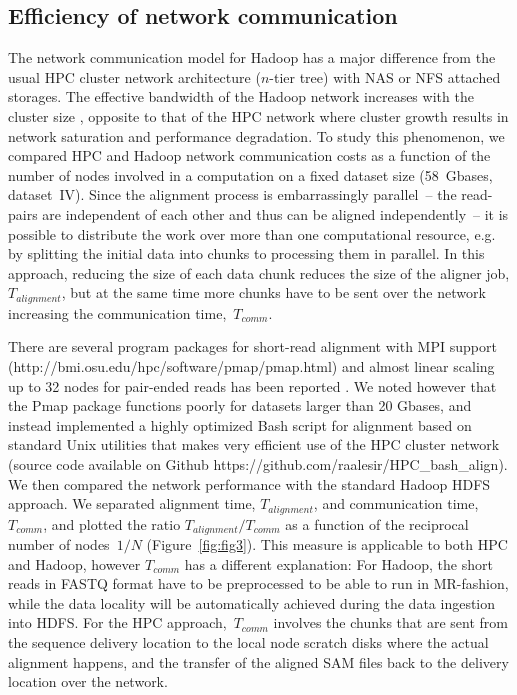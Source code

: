 \documentclass{bioinfo}
\begin{document}
\subsection*{Efficiency of network communication}

The network communication model for Hadoop has a major difference from the usual HPC cluster network architecture ($n$-tier tree) with NAS or NFS attached storages. The effective bandwidth of the Hadoop network increases with the cluster size \citep{Sammer:2012}, opposite to that of the HPC network where cluster growth results in network saturation and performance degradation.
To study this phenomenon, we compared HPC and Hadoop network communication costs
as a function of the number of nodes involved in a computation on a fixed dataset size (58~Gbases, dataset~IV).
 Since the alignment process is embarrassingly parallel~-- the read-pairs are
independent of each other and thus can be aligned independently~-- it is
possible to distribute the work over more than one computational resource, e.g. by
splitting the initial data into chunks to processing them in parallel. In this
approach, reducing the size of each data chunk reduces the size of the aligner
job, $T_{alignment}$, but at the same time more chunks have to be sent over the network increasing the communication time,~$T_{comm}$.

There are several program packages for short-read alignment with MPI support \citep{gnumap} \\(http://bmi.osu.edu/hpc/software/pmap/pmap.html) and almost linear scaling up to 32 nodes for pair-ended reads has been reported \citep{Bozdag:2010cn}.
We noted however that the Pmap package functions poorly for datasets larger than 20 Gbases, and instead implemented a highly optimized Bash script for alignment based on standard Unix utilities that makes very efficient use of the HPC
cluster network (source code available on Github https://github.com/raalesir/HPC\_bash\_align). We then compared the network
performance with the standard Hadoop HDFS approach. We separated alignment
time, $T_{alignment}$, and communication time, $T_{comm}$, and plotted
the ratio $T_{alignment}/T_{comm}$ as a function of the reciprocal number of nodes~$1/N$
(Figure~\ref{fig:fig3}).  This measure is applicable to both HPC and Hadoop,
however $T_{comm}$ has a different explanation: For Hadoop, the short reads in
FASTQ format have to be preprocessed
to be able to run in MR-fashion, while the data locality will be automatically
achieved during the data ingestion into HDFS. For the HPC approach,~$T_{comm}$ involves the chunks that are
sent from the sequence delivery location to the local node scratch disks where
the actual alignment happens, and the transfer of the aligned SAM files back to
the delivery location over the network.
\end{document}
